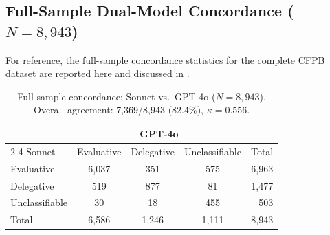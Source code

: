 \subsection{Full-Sample Dual-Model Concordance ($N = 8{,}943$)}
\label{sec:full_concordance}

For reference, the full-sample concordance statistics for the complete CFPB dataset are reported here and discussed in .

\begin{table}[H]
\centering
\caption{Full-sample concordance: Sonnet vs.\ GPT-4o ($N = 8{,}943$). Overall agreement: 7,369/8,943 (82.4\%), $\kappa = 0.556$.}
\label{tab:full_concordance}
\begin{tabular}{lcccr}
\toprule
 & \multicolumn{3}{c}{GPT-4o} & \\
\cmidrule(lr){2-4}
Sonnet & Evaluative & Delegative & Unclassifiable & Total \\
\midrule
Evaluative      & 6,037 & 351 & 575 & 6,963 \\
Delegative      &   519 & 877 &  81 & 1,477 \\
Unclassifiable  &    30 &  18 & 455 &   503 \\
\midrule
Total           & 6,586 & 1,246 & 1,111 & 8,943 \\
\bottomrule
\end{tabular}
\end{table}


